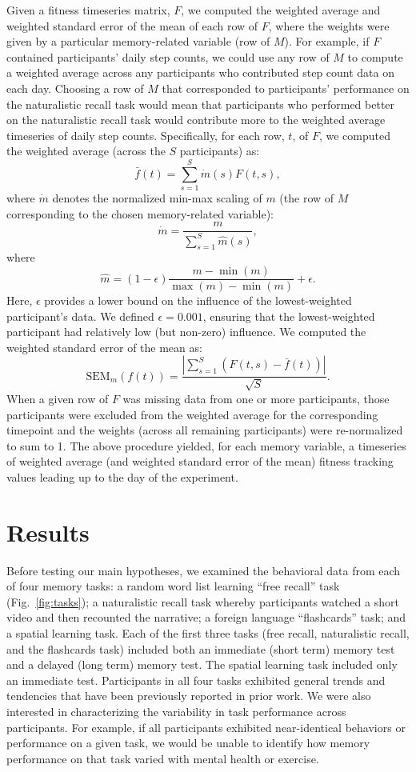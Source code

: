 \documentclass[10pt]{article}
\begin{document}
Given a fitness timeseries matrix, $F$, we computed the weighted
average and weighted standard error of the mean of each row of $F$,
where the weights were given by a particular memory-related variable
(row of $M$).  For example, if $F$ contained participants' daily step
counts, we could use any row of $M$ to compute a weighted average
across any participants who contributed step count data on each day.
Choosing a row of $M$ that corresponded to participants' performance
on the naturalistic recall task would mean that participants who
performed better on the naturalistic recall task would contribute more
to the weighted average timeseries of daily step counts.
Specifically, for each row, $t$, of $F$, we computed the weighted
average (across the $S$ participants) as:
\[
\bar{f}(t) = \sum_{s=1}^S \dot{m}(s) F(t, s),
\]
where $\dot{m}$ denotes the normalized min-max scaling of $m$ (the row
of $M$ corresponding to the chosen memory-related variable):
\[
  \dot{m} = \frac{m}{\sum_{s=1}^S \hat{m}(s)},
\]
where
\[
  \hat{m} = (1 - \epsilon)\frac{m - \min(m)}{\max(m) - \min(m)} + \epsilon.
\]
Here, $\epsilon$ provides a lower bound on the influence of the
lowest-weighted participant's data.  We defined $\epsilon = 0.001$,
ensuring that the lowest-weighted participant had relatively low (but
non-zero) influence.  We computed the weighted standard error of the
mean as:
\[
\mathrm{SEM}_m\left(f(t)\right) = \frac{\left| \sum_{s=1}^S \left( F(t, s) -
    \bar{f}(t)\right) \right|}{\sqrt{S}}.
\]
When a given row of $F$ was missing data from one or more
participants, those participants were excluded from the weighted
average for the corresponding timepoint and the weights (across all
remaining participants) were re-normalized to sum to 1.  The above
procedure yielded, for each memory variable, a timeseries of weighted
average (and weighted standard error of the mean) fitness tracking
values leading up to the day of the experiment.

\section*{Results}
Before testing our main hypotheses, we examined the behavioral data
from each of four memory tasks: a random word list learning ``free
recall'' task (Fig.~\ref{fig:tasks}); a naturalistic recall task whereby participants watched
a short video and then recounted the narrative; a foreign language
``flashcards'' task; and a spatial learning task.  Each of the first
three tasks (free recall, naturalistic recall, and the flashcards
task) included both an immediate (short term) memory test and a
delayed (long term) memory test.  The spatial learning task included
only an immediate test. Participants in all four tasks exhibited
general trends and tendencies that have been previously reported in
prior work.  We were also interested in characterizing the variability
in task performance across participants.  For example, if all
participants exhibited near-identical behaviors or performance on a
given task, we would be unable to identify how memory performance on
that task varied with mental health or exercise.
\end{document}
